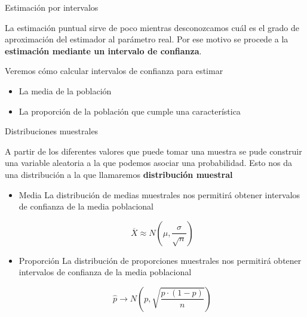 \documentclass[11pt,handout]{beamer}
\begin{document}
\begin{frame}{Estimación por intervalos}
\begin{block}{}
La estimación puntual sirve de poco mientras
desconozcamos cuál es el grado de aproximación del estimador al parámetro real. Por ese motivo se procede
a la \textbf{estimación mediante un intervalo de confianza}.
\end{block}
\pause
Veremos cómo calcular intervalos de confianza para estimar
\begin{itemize}
    \item La media de la población
    \item La proporción de la población que cumple una característica
\end{itemize}
\end{frame}




\begin{frame}{Distribuciones muestrales}
\begin{block}{} A partir de los diferentes valores que puede tomar una muestra se pude construir una variable aleatoria a la que podemos asociar una probabilidad. Esto nos da una distribución a la que llamaremos \textbf{distribución muestral}

\end{block}    
\pause
\begin{itemize}[<+->]
    \item{Media} La distribución de medias muestrales nos permitirá obtener intervalos de confianza de la media poblacional
    \begin{block}{}
        $$\overline{X} \approx N\left(\mu,\frac{\sigma}{\sqrt{n}}\right)$$
    \end{block}

    \item{Proporción} La distribución de proporciones muestrales nos permitirá obtener intervalos de confianza de la media poblacional
    \begin{block}{}
    $$\widehat{p} \rightarrow N \left ( p , \sqrt{ \frac{p \cdot (1-p)} {n}}\right )$$
    \end{block}
    
\end{itemize}

\end{frame}
\end{document}
